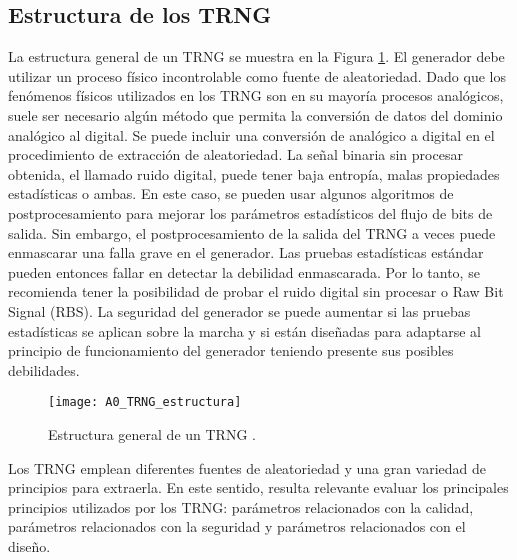 	    \subsection{Estructura de los TRNG}	

            La estructura general de un TRNG se muestra en la Figura \ref{fig:A1_TRNG_estructura}. El generador debe utilizar un proceso físico incontrolable como fuente de aleatoriedad. Dado que los fenómenos físicos utilizados en los TRNG son en su mayoría procesos analógicos, suele ser necesario algún método que permita la conversión de datos del dominio analógico al digital. Se puede incluir una conversión de analógico a digital en el procedimiento de extracción de aleatoriedad. La señal binaria sin procesar obtenida, el llamado ruido digital, puede tener baja entropía, malas propiedades estadísticas o ambas. En este caso, se pueden usar algunos algoritmos de postprocesamiento para mejorar los parámetros estadísticos del flujo de bits de salida. Sin embargo, el postprocesamiento de la salida del TRNG a veces puede enmascarar una falla grave en el generador. Las pruebas estadísticas estándar pueden entonces fallar en detectar la debilidad enmascarada. Por lo tanto, se recomienda tener la posibilidad de probar el ruido digital sin procesar o Raw Bit Signal (RBS). La seguridad del generador se puede aumentar si las pruebas estadísticas se aplican sobre la marcha y si están diseñadas para adaptarse al principio de funcionamiento del generador teniendo presente sus posibles debilidades. \cite{Badrignans2011}
			
            \begin{figure}[hbtp]
                \caption{Estructura general de un TRNG \cite{Badrignans2011}.}
                \centering
                \texttt{[image: A0\_TRNG\_estructura]}
                \label{fig:A1_TRNG_estructura}
            \end{figure}
	
	        Los TRNG emplean diferentes fuentes de aleatoriedad y una gran variedad de principios para extraerla. En este sentido, resulta relevante evaluar los principales principios utilizados por los TRNG: parámetros relacionados con la calidad, parámetros relacionados con la seguridad y parámetros relacionados con el diseño.

